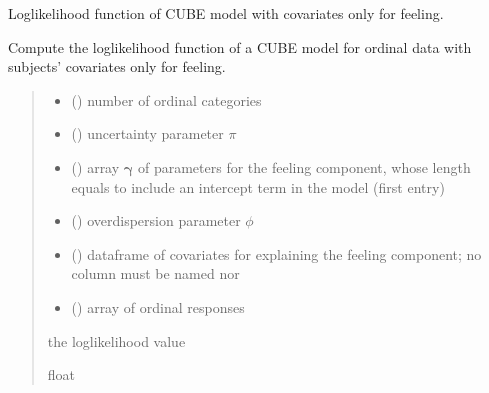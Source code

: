 \documentclass[letterpaper,10pt,english]{sphinxmanual}
\begin{document}
\begin{fulllineitems}
\label{\detokenize{cubmods:cubmods.cube_0w0.loglik}}
\pysigstartsignatures
{}
\pysigstopsignatures
\sphinxAtStartPar
Log\sphinxhyphen{}likelihood function of CUBE model with covariates only for feeling.

\sphinxAtStartPar
Compute the log\sphinxhyphen{}likelihood function of a CUBE model for ordinal data with subjects’ 
covariates only for feeling.
\begin{quote}\begin{description}
\begin{itemize}
\item {} 
\sphinxAtStartPar
{} () \textendash{} number of ordinal categories

\item {} 
\sphinxAtStartPar
{} () \textendash{} uncertainty parameter \(\pi\)

\item {} 
\sphinxAtStartPar
{} () \textendash{} array \(\pmb \gamma\) of parameters for the feeling component, whose length equals 
 to include an intercept term in the model (first entry)

\item {} 
\sphinxAtStartPar
{} () \textendash{} overdispersion parameter \(\phi\)

\item {} 
\sphinxAtStartPar
{} () \textendash{} dataframe of covariates for explaining the feeling component;
no column must be named  nor 

\item {} 
\sphinxAtStartPar
{} () \textendash{} array of ordinal responses

\end{itemize}

\sphinxAtStartPar
the log\sphinxhyphen{}likelihood value

\sphinxAtStartPar
float

\end{description}\end{quote}

\end{fulllineitems}
\end{document}
